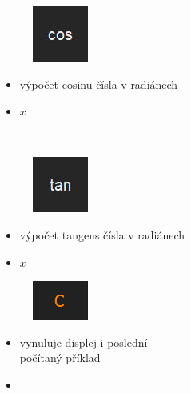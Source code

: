 \documentclass[a4paper, 12pt]{article}
\begin{document}
\begin{minipage}{0.07\textwidth}
\begin{figure}[H]
\includegraphics[scale=0.7]{icos.jpg}
\end{figure}
\end{minipage}
\begin{minipage}{0.45\textwidth}
\begin{itemize}
\item výpočet cosinu čísla v radiánech
\item {} $x$ \keys{=}
\end{itemize}
\end{minipage}
\\%
\begin{minipage}{0.07\textwidth}
\begin{figure}[H]
\includegraphics[scale=0.7]{itan.jpg}
\end{figure}
\end{minipage}
\begin{minipage}{0.45\textwidth}
\begin{itemize}
\item výpočet tangens čísla v radiánech
\item {} $x$ \keys{=}
\end{itemize}
\end{minipage}
\newline
\newline
\begin{minipage}{0.07\textwidth}
\begin{figure}[H]
\includegraphics[scale=0.7]{c.png}
\end{figure}
\end{minipage}
\begin{minipage}[t]{0.45\textwidth}
\begin{itemize}
\item vynuluje displej i poslední\\ počítaný příklad
\item {}
\end{itemize}
\end{minipage}
\end{document}
